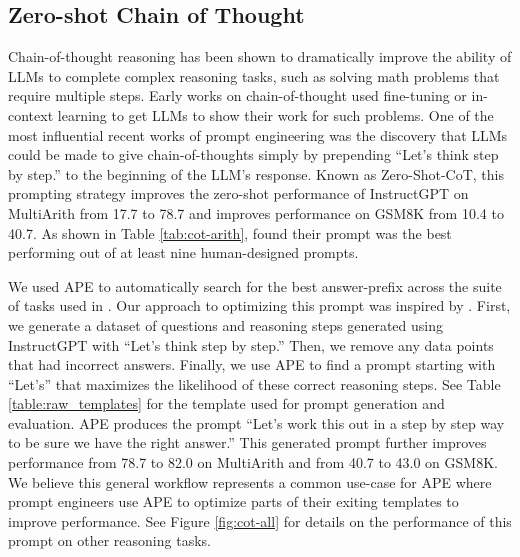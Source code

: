 \subsection{Zero-shot Chain of Thought}\label{sec:cot}
Chain-of-thought reasoning has been shown to dramatically improve the ability of LLMs to complete complex reasoning tasks, such as solving math problems that require multiple steps. Early works \citep{nye2021show,betz2021thinking,wei2022chain} on chain-of-thought used fine-tuning or in-context learning to get LLMs to show their work for such problems. One of the most influential recent works of prompt engineering was the discovery \citep{kojima2022large} that LLMs could be made to give chain-of-thoughts simply by prepending ``Let's think step by step.'' to the beginning of the LLM's response. Known as Zero-Shot-CoT, this prompting strategy improves the zero-shot performance of InstructGPT on MultiArith \citep{roy2016solving} from 17.7 to 78.7 and improves performance on GSM8K\citep{cobbe2021training} from 10.4 to 40.7. As shown in Table \ref{tab:cot-arith}, \citet{kojima2022large} found their prompt was the best performing out of at least nine human-designed prompts.

We used APE to automatically search for the best answer-prefix across the suite of tasks used in \citet{kojima2022large}. Our approach to optimizing this prompt was inspired by \citet{zelikman2022star}. First, we generate a dataset of questions and reasoning steps generated using InstructGPT with ``Let's think step by step.'' Then, we remove any data points that had incorrect answers. Finally, we use APE to find a prompt starting with ``Let's'' that maximizes the likelihood of these correct reasoning steps. See Table \ref{table:raw_templates} for the template used for prompt generation and evaluation. APE produces the prompt ``Let’s work this out in a step by step way to be sure we have the right answer.'' This generated prompt further improves performance from 78.7 to 82.0 on MultiArith and from 40.7 to 43.0 on GSM8K. We believe this general workflow represents a common use-case for APE where prompt engineers use APE to optimize parts of their exiting templates to improve performance. See Figure \ref{fig:cot-all} for details on the performance of this prompt on other reasoning tasks.

